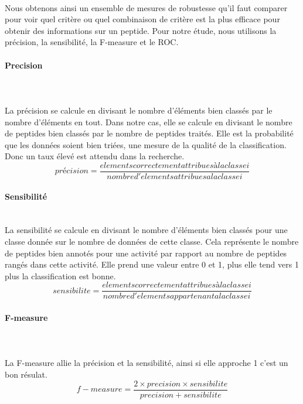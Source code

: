 \documentclass[a4paper,10pt]{report}
\begin{document}
	  ~\\
	  Nous obtenons ainsi un ensemble de mesures de robustesse qu'il faut comparer pour voir quel critère ou quel combinaison de critère est la plus efficace pour obtenir des informations sur un peptide.
	  Pour notre étude, nous utilisons la précision, la sensibilité, la F-measure et le ROC.
	     
	     \paragraph{Precision}\\
	      
	     ~\\ 
	     La précision se calcule en divisant le nombre d'éléments bien classés par le nombre d'éléments en tout.
	     Dans notre cas, elle se calcule en divisant le nombre de peptides bien classés par le nombre de peptides traités.
	     Elle est la probabilité que les données soient bien triées, une mesure de la qualité de la classification. 
	     Donc un taux élevé est attendu dans la recherche.
	     \[ 
	      précision = \frac{ elements correctement attribues à la classe i }{ nombre d'elements attribues a la classe i }
	     \]

	     
	     \paragraph{Sensibilité}
	     
	     ~\\
	     La sensibilité se calcule en divisant le nombre d'éléments bien classés pour une classe donnée sur le nombre de données de cette classe. 
	     Cela représente le nombre de peptides bien annotés pour une activité par rapport au nombre de peptides rangés dans cette activité.
	     Elle prend une valeur entre 0 et 1, plus elle tend vers 1 plus la classification est bonne.
	     \[
	      sensibilite = \frac{ elements correctement attribues à la classe i }{ nombre d'elements appartenant a la classe i }
	     \]

	     \paragraph{F-measure}\\
	     
	     ~\\La F-measure allie la précision et la sensibilité, ainsi si elle approche 1 c'est un bon résulat.
	     \[
	      f-measure = \frac{ 2 \times precision \times sensibilite }{ precision + sensibilite }
	     \]
\end{document}
